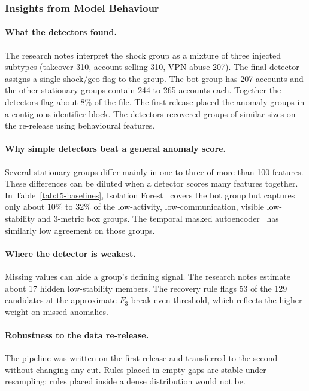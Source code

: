 \documentclass[../main.tex]{subfiles}
\begin{document}
\subsubsection{Insights from Model Behaviour}

\paragraph{What the detectors found.} The research notes interpret the shock group as a mixture of three injected subtypes (takeover 310, account selling 310, VPN abuse 207). The final detector assigns a single shock/geo flag to the group. The bot group has 207 accounts and the other stationary groups contain 244 to 265 accounts each. Together the detectors flag about 8\% of the file. The first release placed the anomaly groups in a contiguous identifier block. The detectors recovered groups of similar sizes on the re-release using behavioural features.

\paragraph{Why simple detectors beat a general anomaly score.} Several stationary groups differ mainly in one to three of more than 100 features. These differences can be diluted when a detector scores many features together. In Table~\ref{tab:t5-baselines}, Isolation Forest~\citep{isolationforest} covers the bot group but captures only about 10\% to 32\% of the low-activity, low-communication, visible low-stability and 3-metric box groups. The temporal masked autoencoder~\citep{mae} has similarly low agreement on those groups.

\paragraph{Where the detector is weakest.} Missing values can hide a group's defining signal. The research notes estimate about 17 hidden low-stability members. The recovery rule flags 53 of the 129 candidates at the approximate $F_3$ break-even threshold, which reflects the higher weight on missed anomalies.

\paragraph{Robustness to the data re-release.} The pipeline was written on the first release and transferred to the second without changing any cut. Rules placed in empty gaps are stable under resampling; rules placed inside a dense distribution would not be.
\end{document}
